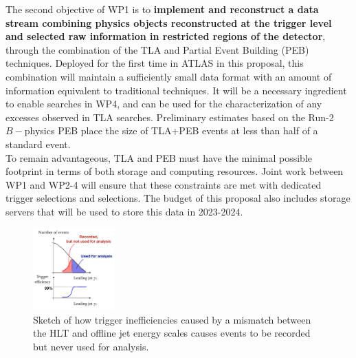 The second objective of WP1 is to \textbf{implement and reconstruct a data stream combining physics objects reconstructed at the trigger level and selected raw information in restricted regions of the detector}, through the combination of the TLA and Partial Event Building (PEB) techniques. 
Deployed for the first time in ATLAS in this proposal, this combination will maintain a sufficiently small data format with an amount of information equivalent to traditional techniques. 
It will be a necessary ingredient to enable searches in WP4, and can be used for the characterization of any excesses observed in TLA searches. 
Preliminary estimates based on the Run-2 $B-$physics PEB %
place the size of TLA+PEB events at less than half of a standard event. \\
\indent
To remain advantageous, TLA and PEB must have the minimal possible footprint in terms of both storage and computing resources. 
Joint work between WP1 and WP2-4 will ensure that these constraints are met with dedicated trigger selections and selections.   
The budget of this proposal also includes storage servers that will be used to store this data in 2023-2024. 

\begin{figure} 
\begin{center}
\includegraphics[width=0.28\textwidth]{figs_B2/efficiencySketch}
\caption{\color{black}\label{fig:wastedRate} \small Sketch of how trigger inefficiencies caused by a mismatch between the HLT and offline jet energy scales causes events to be recorded but never used for analysis.} %
\end{center}
\vskip-5pt
\end{figure}

